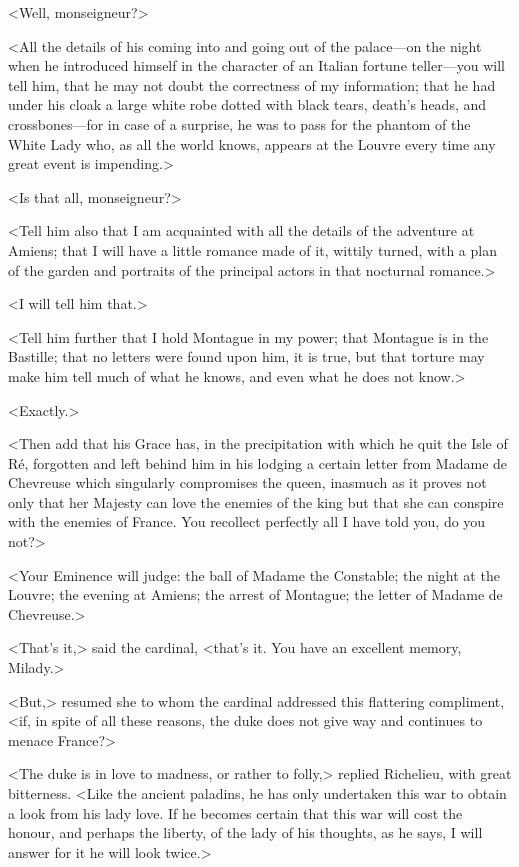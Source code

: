 <Well, monseigneur?> 

<All the details of his coming into and going out of the palace—on the night when he introduced himself in the character of an Italian fortune teller—you will tell him, that he may not doubt the correctness of my information; that he had under his cloak a large white robe dotted with black tears, death's heads, and crossbones—for in case of a surprise, he was to pass for the phantom of the White Lady who, as all the world knows, appears at the Louvre every time any great event is impending.> 

<Is that all, monseigneur?> 

<Tell him also that I am acquainted with all the details of the adventure at Amiens; that I will have a little romance made of it, wittily turned, with a plan of the garden and portraits of the principal actors in that nocturnal romance.> 

<I will tell him that.> 

<Tell him further that I hold Montague in my power; that Montague is in the Bastille; that no letters were found upon him, it is true, but that torture may make him tell much of what he knows, and even what he does not know.> 

<Exactly.> 

<Then add that his Grace has, in the precipitation with which he quit the Isle of Ré, forgotten and left behind him in his lodging a certain letter from Madame de Chevreuse which singularly compromises the queen, inasmuch as it proves not only that her Majesty can love the enemies of the king but that she can conspire with the enemies of France. You recollect perfectly all I have told you, do you not?> 

<Your Eminence will judge: the ball of Madame the Constable; the night at the Louvre; the evening at Amiens; the arrest of Montague; the letter of Madame de Chevreuse.> 

<That's it,> said the cardinal, <that's it. You have an excellent memory, Milady.> 

<But,> resumed she to whom the cardinal addressed this flattering compliment, <if, in spite of all these reasons, the duke does not give way and continues to menace France?> 

<The duke is in love to madness, or rather to folly,> replied Richelieu, with great bitterness. <Like the ancient paladins, he has only undertaken this war to obtain a look from his lady love. If he becomes certain that this war will cost the honour, and perhaps the liberty, of the lady of his thoughts, as he says, I will answer for it he will look twice.> 

